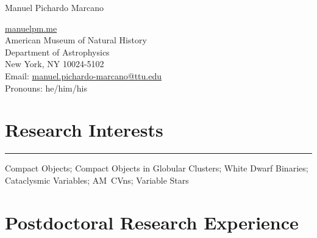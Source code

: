 \documentclass[letterpaper,10pt]{article}
\def\name{Manuel Pichardo Marcano}
\begin{document}
\begin{huge}
\name
\end{huge}





\vspace{.3 cm}

\begin{minipage}{0.6\linewidth}
  \href{www.manuelpm.me}{manuelpm.me} \\
American Museum of Natural History \\
  Department of Astrophysics \\
  New York, NY 10024-5102\\
Email:  \href{mailto:manuel.pichardo-marcano@ttu.edu}{manuel.pichardo-marcano@ttu.edu}\\
 Pronouns: he/him/his 
\end{minipage}

\section*{Research Interests}

\hrule
\vspace{.3 cm}


Compact Objects; Compact Objects in Globular Clusters; White Dwarf Binaries; Cataclysmic Variables; AM~CVns; Variable Stars



\section*{Postdoctoral Research Experience}
\end{document}
